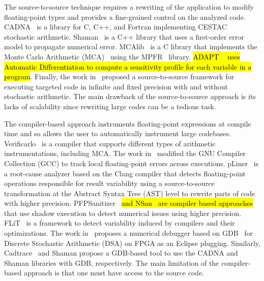 \documentclass[10pt,journal,compsoc]{IEEEtran}
\DeclareRobustCommand{\add}[1]{\sethlcolor{lightgreen}\hl{#1}}
\DeclareRobustCommand{\add}[1]{#1}
\begin{document}
The source-to-source technique requires a rewriting of the application to modify
floating-point types and provides a fine-grained control on the analyzed code.
CADNA~\cite{jezequel2008cadna} is a library for C, C++, and Fortran implementing
CESTAC~\cite{vignes1993stochastic} stochastic arithmetic.
Shaman~\cite{demeure_phd} is a C++ library that uses a first-order error model
to propagate numerical error. MCAlib~\cite{frechtling2015mcalib} is a C library
that implements the Monte Carlo Arithmetic (MCA)~\cite{parker1997monte} using
the MPFR~\cite{fousse2007mpfr} library. \add{ADAPT \mbox{~\cite{menon2018adapt}} uses
    Automatic Differentiation to compute a sensitivity profile for each variable in a
    program}. Finally, the work in~\cite{tang2016software} proposed a
source-to-source framework for executing targeted code in infinite and fixed
precision with and without stochastic arithmetic. The main drawback of the
source-to-source approach is its lacks of scalability since rewriting large
codes can be a tedious task.


The compiler-based approach instruments floating-point expressions at compile
time and so allows the user to automatically instrument large codebases.
Verificarlo~\cite{verificarlo} is a compiler that supports different types of
arithmetic instrumentations, including MCA. The work in~\cite{bao2013fly}
modified the GNU Compiler Collection (GCC) to track local floating-point errors
across executions. pLiner~\cite{guo2020pliner} is a root-cause analyzer based on
the Clang compiler that detects floating-point operations responsible for result
variability using a source-to-source transformation at the Abstract Syntax Tree
(AST) level to rewrite parts of code with higher precision.
PFPSanitizer~\cite{chowdhary2020debugging,chowdhary2021parallel} \add{and
    NSan~\mbox{\cite{courbet2021nsan}} are compiler based approaches}
that use shadow execution to detect numerical issues using higher
precision.
FLiT~\cite{sawaya2017flit} is a framework to detect variability
induced by compilers and their optimizations. The work
in~\cite{wang2012development} proposes a numerical debugger based on
GDB~\cite{stallman1988debugging} for Discrete Stochastic Arithmetic (DSA) on
FPGA as an Eclipse plugging. Similarly, Cadtrace~\cite{jezequel2008cadna} and
Shaman propose a GDB-based tool to use the CADNA and Shaman libraries with GDB,
respectively. The main limitation of the compiler-based approach is that one
must have access to the source code.
\end{document}
